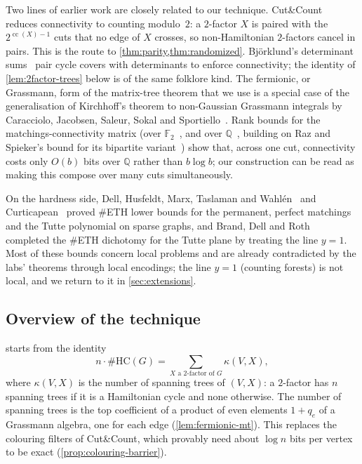 \documentclass[11pt]{amsart}
\theoremstyle{plain}
\theoremstyle{definition}
\theoremstyle{remark}
\numberwithin{equation}{section}
\newcommand{\HC}{\#\mathrm{HC}}
\newcommand{\Q}{\mathbb{Q}}
\newcommand{\cc}{\operatorname{cc}}
\begin{document}
Two lines of earlier work are closely related to our technique. Cut\&Count~\cite{CutAndCount11}
reduces connectivity to counting modulo~$2$: a $2$-factor $X$ is paired with the $2^{\cc(X)-1}$
cuts that no edge of $X$ crosses, so non-Hamiltonian $2$-factors cancel in pairs. This is the
route to \cref{thm:parity,thm:randomized}. Björklund's determinant sums~\cite{Bjorklund14} pair
cycle covers with determinants to enforce connectivity; the identity of \cref{lem:2factor-trees}
below is of the same folklore kind. The fermionic, or Grassmann, form of the matrix-tree theorem
that we use is a special case of the generalisation of Kirchhoff's theorem to non-Gaussian
Grassmann integrals by Caracciolo, Jacobsen, Saleur, Sokal and Sportiello~\cite{CJSSS04}. Rank
bounds for the matchings-connectivity matrix (over $\mathbb F_2$~\cite{CKN18}, and over $\Q$~\cite{CLN18},
building on Raz and Spieker's bound for its bipartite variant~\cite{RazSpieker95}) show that, across one cut, connectivity
costs only $O(b)$ bits over $\Q$ rather than $b\log b$; our construction can be read as making
this compose over many cuts simultaneously.

On the hardness side, Dell, Husfeldt, Marx, Taslaman and Wahl\'en~\cite{DHMTW14} and
Curticapean~\cite{Curticapean18} proved $\#$ETH lower bounds for the permanent, perfect matchings
and the Tutte polynomial on sparse graphs, and Brand, Dell and Roth~\cite{BrandDellRoth19}
completed the $\#$ETH dichotomy for the Tutte plane by treating the line $y=1$. Most of these
bounds concern local problems and are already contradicted by the labs' theorems through local
encodings; the line $y=1$ (counting forests) is not local, and we return to it in
\cref{sec:extensions}.

\subsection{Overview of the technique}
 starts from the identity
\begin{equation}\label{eq:intro-identity}
  n\cdot\HC(G) = \sum_{X\text{ a $2$-factor of } G} \kappa(V,X),
\end{equation}
where $\kappa(V,X)$ is the number of spanning trees of $(V,X)$: a $2$-factor has $n$ spanning
trees if it is a Hamiltonian cycle and none otherwise. The number of spanning trees is the top
coefficient of a product of even elements $1+q_e$ of a Grassmann algebra, one for each edge
(\cref{lem:fermionic-mt}). This replaces the colouring filters of Cut\&Count, which provably
need about $\log n$ bits per vertex to be exact (\cref{prop:colouring-barrier}).
\end{document}
